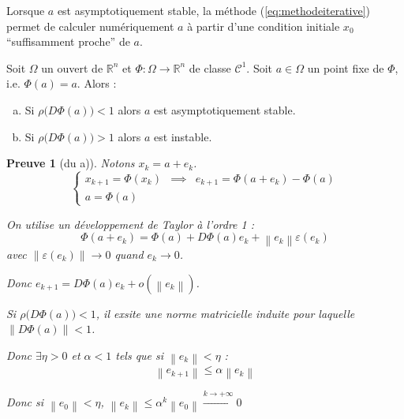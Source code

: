 \documentclass[a4paper,11pt]{article}
\newcommand{\R}{\mathbb{R}}
\newcommand{\norm}[1]{\left\lVert#1\right\rVert}
\theoremstyle{plain} %
\newtheorem{preuve}{Preuve}
\begin{document}
Lorsque $a$ est asymptotiquement stable, la méthode (\ref{eq:methodeiterative}) permet de calculer numériquement $a$ à partir d'une condition initiale $x_0$ ``suffisamment proche'' de $a$.

\begin{ftheo}
    Soit $\Omega$ un ouvert de $\R^n$ et $\Phi : \Omega \to \R^n$ de classe $\mathcal{C}^1$.
    Soit $a \in \Omega$ un point fixe de $\Phi$, i.e. $\Phi(a) = a$. Alors :
    \begin{enumerate}[a)]
        \item Si $\rho \Big(D\Phi(a) \Big) < 1$ alors $a$ est asymptotiquement stable.
        \item Si $\rho \Big(D\Phi(a) \Big) > 1$ alors $a$ est instable.
    \end{enumerate}
\end{ftheo}


\begin{preuve}[du a)]
    Notons $x_k = a + e_k$.
    \begin{equation*}
        \left\lbrace
        \begin{array}{ccc}
            x_{k+1} = \Phi (x_k) & \implies & e_{k+1} = \Phi(a+e_k) - \Phi(a) \\
            a = \Phi(a)
        \end{array}
        \right.
    \end{equation*}

    On utilise un développement de Taylor à l'ordre 1 :
    \[
        \Phi(a+e_k) = \Phi(a) + D\Phi(a) e_k + \norm{e_k}\varepsilon(e_k)
    \]
    avec $\norm{\varepsilon(e_k)} \to 0$ quand $e_k \to 0$.


    \vspace{0.5cm}
    Donc $e_{k+1} = D\Phi(a) e_k + o(\norm{e_k})$.

    Si $\rho \big(D\Phi(a) \big) < 1$, il exsite une norme matricielle induite pour
laquelle $\norm{D\Phi(a)}<1$.

    Donc $\exists \eta > 0$ et $\alpha < 1$ tels que si $\norm{e_k} < \eta$ :
    \[
        \norm{e_{k+1}} \leq \alpha \norm{e_k}
    \]

    Donc si $\norm{e_0} < \eta$, $\norm{e_k} \leq \alpha^k \norm{e_0} \xrightarrow{k \to +\infty}0$
\end{preuve}
\end{document}
